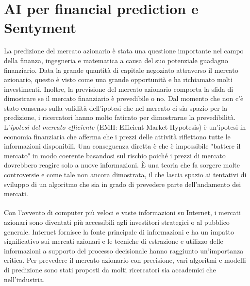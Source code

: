 \documentclass[a4paper,12pt]{report}
\begin{document}
\newpage
\chapter{AI per financial prediction e Sentyment}
\label{cap2}
La predizione del mercato azionario è stata una questione importante nel campo della finanza, ingegneria e matematica a causa del suo potenziale guadagno finanziario. Data la grande quantità di capitale negoziato attraverso il mercato azionario, questo è visto come una grande opportunità e ha richiamato molti investimenti. Inoltre, la previsione del mercato azionario comporta la sfida di dimostrare se il mercato finanziario è prevedibile o no. Dal momento che non c'è stato consenso sulla validità dell'ipotesi che nel mercato ci sia spazio per la predizione, i ricercatori hanno molto faticato per dimostrarne la prevedibilità\cite{nn1}. L'\textit{ipotesi del mercato efficiente} (EMH: Efficient Market Hypotesis) è un'ipotesi in economia finanziaria che afferma che i prezzi delle attività riflettono tutte le informazioni disponibili. Una conseguenza diretta è che è impossibile "battere il mercato" in modo coerente basandosi sul rischio poiché i prezzi di mercato dovrebbero reagire solo a nuove informazioni. È una teoria che fa sorgere molte controversie e come tale non ancora dimostrata, il che lascia spazio ai tentativi di sviluppo di un algoritmo che sia in grado di prevedere parte dell'andamento dei mercati.\\~\\
Con l'avvento di computer più veloci e vaste informazioni su Internet, i mercati azionari sono diventati più accessibili agli investitori strategici o al pubblico generale. Internet fornisce la fonte principale di informazioni e ha un impatto significativo sui mercati azionari e le tecniche di estrazione e utilizzo delle informazioni a supporto del processo decisionale hanno raggiunto un'importanza critica. Per prevedere il mercato azionario con precisione, vari algoritmi e modelli di predizione sono stati proposti da molti ricercatori sia accademici che nell'industria.\\~\\
\end{document}
